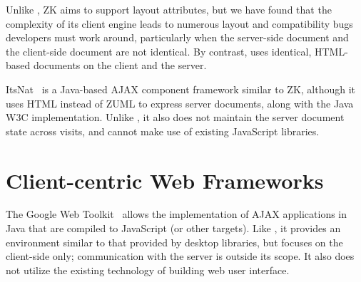 Unlike \projectname{}, ZK aims to support layout attributes, but
we have found that the complexity of its client engine leads to 
numerous layout and compatibility bugs developers must work around,
particularly when the server-side document and the client-side
document are not identical.  By contrast, \cb uses identical, HTML-based
documents on the client and the server.

ItsNat~\cite{JoseMariaArranzSantamariaItsNat} is a Java-based AJAX
component framework similar to ZK, although it uses HTML instead of
ZUML to express server documents, along with the Java W3C implementation.  
Unlike \projectname, it also does not maintain the server document 
state across visits, and cannot make use of existing JavaScript libraries.







\section{Client-centric Web Frameworks}

The Google Web Toolkit~\cite{GWT} allows the implementation of
AJAX applications in Java that are compiled to JavaScript (or other
targets).  Like \projectname, it provides an environment similar to 
that provided by desktop libraries, but focuses on the client-side only; 
communication with the server is outside its scope.
It also does not utilize the existing technology of building web user interface.




